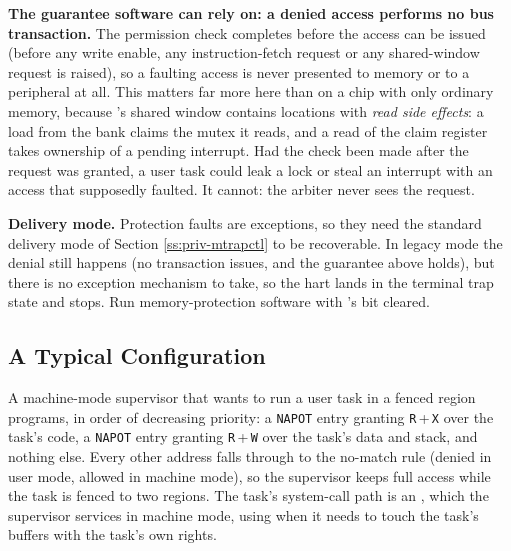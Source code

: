 \textbf{The guarantee software can rely on: a denied access performs no bus transaction.} The permission check completes before the access can be issued (before any write enable, any instruction-fetch request or any shared-window request is raised), so a faulting access is never presented to memory or to a peripheral at all. This matters far more here than on a chip with only ordinary memory, because \AsicNameForUserGuide{}'s shared window contains locations with \textit{read side effects}: a load from the  bank claims the mutex it reads, and a read of the  claim register takes ownership of a pending interrupt. Had the check been made after the request was granted, a user task could leak a lock or steal an interrupt with an access that supposedly faulted. It cannot: the arbiter never sees the request.

\textbf{Delivery mode.} Protection faults are exceptions, so they need the standard delivery mode of Section \ref{ss:priv-mtrapctl} to be recoverable. In legacy mode the denial still happens (no transaction issues, and the guarantee above holds), but there is no exception mechanism to take, so the hart lands in the terminal trap state and stops. Run memory-protection software with 's  bit cleared.

\subsection{A Typical Configuration}

A machine-mode supervisor that wants to run a user task in a fenced region programs, in order of decreasing priority: a \texttt{NAPOT} entry granting \texttt{R}\,+\,\texttt{X} over the task's code, a \texttt{NAPOT} entry granting \texttt{R}\,+\,\texttt{W} over the task's data and stack, and nothing else. Every other address falls through to the no-match rule (denied in user mode, allowed in machine mode), so the supervisor keeps full access while the task is fenced to two regions. The task's system-call path is an , which the supervisor services in machine mode, using  when it needs to touch the task's buffers with the task's own rights.

\fi
